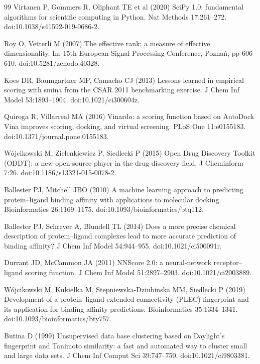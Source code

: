\begin{thebibliography}{99}
 Virtanen P, Gommers R, Oliphant TE et al (2020) SciPy 1.0:
fundamental algorithms for scientific computing in Python. Nat Methods
17:261--272. doi:10.1038/s41592-019-0686-2.

 Roy O, Vetterli M (2007) The effective rank: a measure of
effective dimensionality. In: 15th European Signal Processing Conference,
Pozna\'n, pp 606--610. doi:10.5281/zenodo.40328.

 Koes DR, Baumgartner MP, Camacho CJ (2013) Lessons learned in empirical
scoring with smina from the CSAR 2011 benchmarking exercise. J Chem Inf Model 53:1893--1904.
doi:10.1021/ci300604z.

 Quiroga R, Villarreal MA (2016) Vinardo: a scoring function based on
AutoDock Vina improves scoring, docking, and virtual screening. PLoS One 11:e0155183.
doi:10.1371/journal.pone.0155183.

 W\'ojcikowski M, Zielenkiewicz P, Siedlecki P (2015) Open Drug Discovery
Toolkit (ODDT): a new open-source player in the drug discovery field. J Cheminform 7:26.
doi:10.1186/s13321-015-0078-2.

 Ballester PJ, Mitchell JBO (2010) A machine learning approach to
predicting protein--ligand binding affinity with applications to molecular docking.
Bioinformatics 26:1169--1175. doi:10.1093/bioinformatics/btq112.

 Ballester PJ, Schreyer A, Blundell TL (2014) Does a more
precise chemical description of protein--ligand complexes lead to more accurate prediction of
binding affinity? J Chem Inf Model 54:944--955. doi:10.1021/ci500091r.

 Durrant JD, McCammon JA (2011) NNScore 2.0: a neural-network
receptor--ligand scoring function. J Chem Inf Model 51:2897--2903. doi:10.1021/ci2003889.

 W\'ojcikowski M, Kukie{\l}ka M, Stepniewska-Dziubinska MM, Siedlecki P
(2019) Development of a protein--ligand extended connectivity (PLEC) fingerprint and its
application for binding affinity predictions. Bioinformatics 35:1334--1341.
doi:10.1093/bioinformatics/bty757.

 Butina D (1999) Unsupervised data base clustering based on
Daylight's fingerprint and Tanimoto similarity: a fast and automated way to
cluster small and large data sets. J Chem Inf Comput Sci 39:747--750.
doi:10.1021/ci9803381.


\end{thebibliography}

